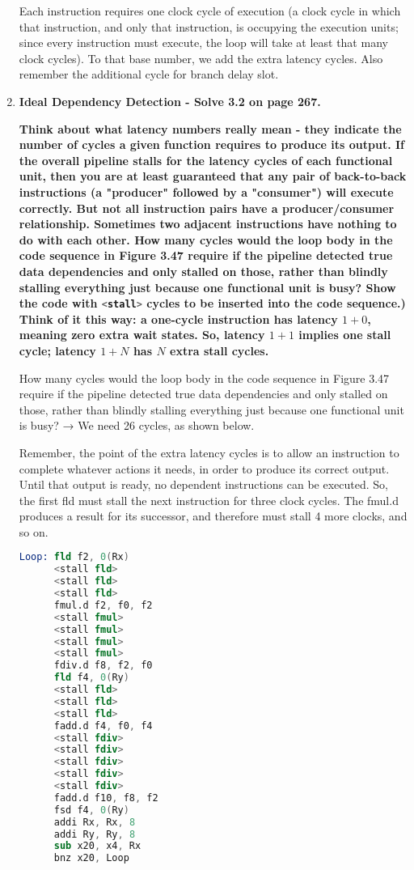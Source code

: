 \begin{enumerate}
    Each instruction requires one clock cycle of execution (a clock cycle in which that instruction, and only that instruction, is occupying the execution units; since every instruction must execute, the loop will take at least that many clock cycles). To that base number, we add the extra latency cycles. Also remember the additional cycle for branch delay slot.
    
    \item \textbf{Ideal Dependency Detection - Solve 3.2 on page 267.}
    
    \textbf{Think about what latency numbers really mean - they indicate the number of cycles a given function requires to produce its output. If the overall pipeline stalls for the latency cycles of each functional unit, then you are at least guaranteed that any pair of back-to-back instructions (a "producer" followed by a "consumer") will execute correctly. But not all instruction pairs have a producer/consumer relationship. Sometimes two adjacent instructions have nothing to do with each other. How many cycles would the loop body in the code sequence in Figure 3.47 require if the pipeline detected true data dependencies and only stalled on those, rather than blindly stalling everything just because one functional unit is busy? Show the code with \lstinline[language=Assembler]{<stall>} cycles to be inserted into the code sequence.) Think of it this way: a one-cycle instruction has latency $1+0$, meaning zero extra wait states. So, latency $1+1$ implies one stall cycle; latency $1+N$ has $N$ extra stall cycles.}
    
    How many cycles would the loop body in the code sequence in Figure 3.47 require if the pipeline detected true data dependencies and only stalled on those, rather than blindly stalling everything just because one functional unit is busy? → We need 26 cycles, as shown below. 
    
    Remember, the point of the extra latency cycles is to allow an instruction to complete whatever actions it needs, in order to produce its correct output. Until that output is ready, no dependent instructions can be executed. So, the first fld must stall the next instruction for three clock cycles. The fmul.d produces a result for its successor, and therefore must stall 4 more clocks, and so on.
    
    \begin{lstlisting}[language=Assembler]
Loop: fld f2, 0(Rx)
      <stall fld>
      <stall fld>
      <stall fld>
      fmul.d f2, f0, f2 
      <stall fmul>
      <stall fmul>
      <stall fmul>
      <stall fmul>
      fdiv.d f8, f2, f0 
      fld f4, 0(Ry)
      <stall fld>
      <stall fld>
      <stall fld>
      fadd.d f4, f0, f4
      <stall fdiv>
      <stall fdiv>
      <stall fdiv>
      <stall fdiv>
      <stall fdiv>
      fadd.d f10, f8, f2
      fsd f4, 0(Ry) 
      addi Rx, Rx, 8
      addi Ry, Ry, 8
      sub x20, x4, Rx 
      bnz x20, Loop
    \end{lstlisting}
    

\end{enumerate}
